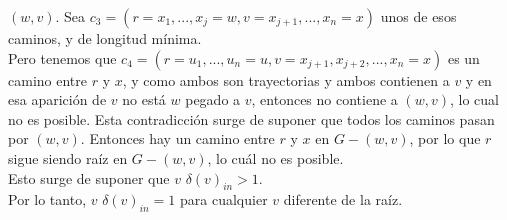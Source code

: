 \documentclass[12pt,a4paper]{report}
\begin{document}
\begin{enumerate}
{			$(w, v)$. Sea $c_3 = (r = x_1, ..., x_j = w, v = x_{j+1}, ..., x_n = x)$
			unos de esos caminos, y de longitud mínima.\\
			Pero tenemos que $c_4 = (r = u_1, ..., u_n = u, v = x_{j+1}, x_{j+2}, ..., x_n = x)$
			es un camino entre $r$ y $x$, y como ambos son trayectorias y ambos contienen
			a $v$ y en esa aparición de $v$ no está $w$ pegado a $v$, entonces no
			contiene a $(w, v)$, lo cual no es posible. Esta contradicción surge de
			suponer que todos los caminos pasan por $(w, v)$. Entonces hay un camino
			entre $r$ y $x$ en  $G - {(w, v)}$, por lo que $r$ sigue siendo raíz en
			$G - {(w, v)}$, lo cuál no es posible.\\
			Esto surge de suponer que $v$ $\delta(v)_{in} > 1$.\\
			Por lo tanto, $v$ $\delta(v)_{in} = 1$ para cualquier $v$ diferente de la
			raíz.\\

}
\end{enumerate}
\end{document}
